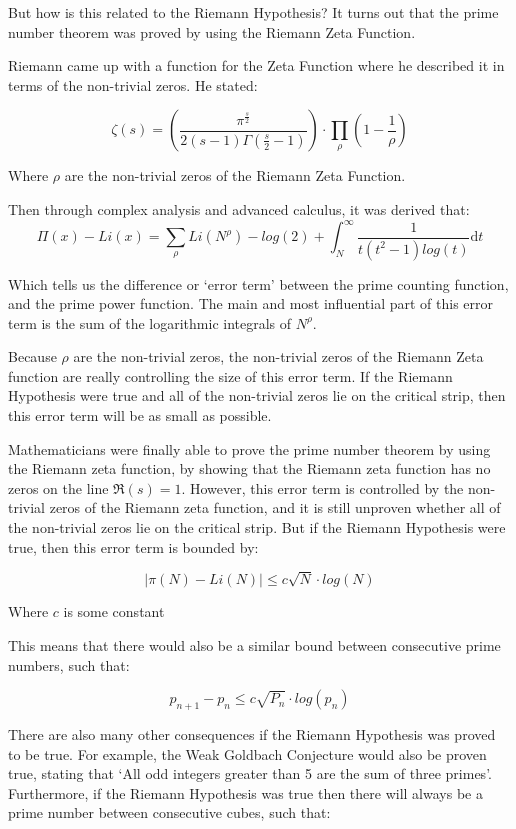 \documentclass{article}
\begin{document}
But how is this related to the Riemann Hypothesis? It turns out that the prime number theorem was proved by using the Riemann Zeta Function.

Riemann came up with a function for the Zeta Function where he described it in terms of the non-trivial zeros. He stated:

$$\zeta(s) = \left(\frac{\pi^{\frac{s}{2}}}{2\left(s-1\right)\Gamma\left(\frac{s}{2}-1\right)} \right ) \cdot \prod_{\rho}\left(1-\frac{1}{\rho}\right)$$

Where $\rho$ are the non-trivial zeros of the Riemann Zeta Function.

Then through complex analysis and advanced calculus, it was derived that:
$$\Pi(x) - Li(x) = \sum_{\rho}Li(N^\rho) - log(2) + \int_{N}^{\infty} \frac{1}{t(t^2-1)log(t)} \mathrm{d}t$$

Which tells us the difference or ‘error term’ between the prime counting function, and the prime power function. The main and most influential part of this error term is the sum of the logarithmic integrals of $N^\rho$.

Because $\rho$ are the non-trivial zeros, the non-trivial zeros of the Riemann Zeta function are really controlling the size of this error term. If the Riemann Hypothesis were true and all of the non-trivial zeros lie on the critical strip, then this error term will be as small as possible.

Mathematicians were finally able to prove the prime number theorem by using the Riemann zeta function, by showing that the Riemann zeta function has no zeros on the line $\Re(s) = 1$. However, this error term is controlled by the non-trivial zeros of the Riemann zeta function, and it is still unproven whether all of the non-trivial zeros lie on the critical strip. But if the Riemann Hypothesis were true, then this error term is bounded by:

$$|\pi(N) - Li(N)| \leq c \sqrt{N} \cdot log(N)$$

Where $c$ is some constant

This means that there would also be a similar bound between consecutive prime numbers, such that:

$$p_{n+1} - p_{n} \leq c \sqrt{P_{n}} \cdot log(p_{n})$$

There are also many other consequences if the Riemann Hypothesis was proved to be true. For example, the Weak Goldbach Conjecture would also be proven true, stating that ‘All odd integers greater than 5 are the sum of three primes’. Furthermore, if the Riemann Hypothesis was true then there will always be a prime number between consecutive cubes, such that:
\end{document}

